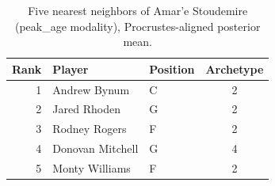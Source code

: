 \begin{table}[htbp]
  \centering\small
  \begin{tabular}{rllc}
    \toprule
    Rank & Player & Position & Archetype \\
    \midrule
    1 & Andrew Bynum & C & 2 \\
    2 & Jared Rhoden & G & 2 \\
    3 & Rodney Rogers & F & 2 \\
    4 & Donovan Mitchell & G & 4 \\
    5 & Monty Williams & F & 2 \\
    \bottomrule
  \end{tabular}
  \caption{Five nearest neighbors of Amar'e Stoudemire (peak_age modality), Procrustes-aligned posterior mean.}
  \label{tab:Amar_e_Stoudemire_neighbors_peak_age}
\end{table}

